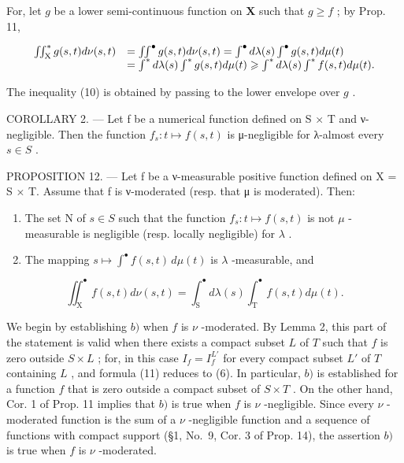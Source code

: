 For, let \(g\) be a lower semi-continuous function on \(\mathbf{X}\) such that \(g \geqslant f\) ; by Prop. 11,

\[
\begin{array}{r l} \iint_ {\mathrm{X}} ^ {*} g (s, t) d \nu (s, t) & = \iint^ {\bullet} g (s, t) d \nu (s, t) = \int^ {\bullet} d \lambda (s) \int^ {\bullet} g (s, t) d \mu (t) \\ & = \int^ {*} d \lambda (s) \int^ {*} g (s, t) d \mu (t) \geqslant \int^ {*} d \lambda (s) \int^ {*} f (s, t) d \mu (t). \end{array}
\]

The inequality (10) is obtained by passing to the lower envelope over \(g\) .

COROLLARY 2. --- Let f be a numerical function defined on S × T and ν-negligible. Then the function \(f_{s}: t \mapsto f(s, t)\) is μ-negligible for λ-almost every \(s \in S\) .

PROPOSITION 12. --- Let f be a ν-measurable positive function defined on X = S × T. Assume that f is ν-moderated (resp. that μ is moderated). Then:

\begin{enumerate}
\def\labelenumi{\alph{enumi})}
\item
  The set N of \(s \in S\) such that the function \(f_{s}: t \mapsto f(s, t)\) is not \(\mu\) -measurable is negligible (resp. locally negligible) for \(\lambda\) .
\item
  The mapping \(s \mapsto \int^{\bullet} f(s, t) \, d\mu(t)\) is \(\lambda\) -measurable, and
\end{enumerate}

\[
\iint_ {\mathrm{X}} ^ {\bullet} f (s, t) d \nu (s, t) = \int_ {\mathrm{S}} ^ {\bullet} d \lambda (s) \int_ {\mathrm{T}} ^ {\bullet} f (s, t) d \mu (t).\tag{11}
\]

We begin by establishing \(b)\) when \(f\) is \(\nu\) -moderated. By Lemma 2, this part of the statement is valid when there exists a compact subset \(L\) of \(T\) such that \(f\) is zero outside \(S \times L\) ; for, in this case \(I_f = I_f^{L'}\) for every compact subset \(L'\) of \(T\) containing \(L\) , and formula (11) reduces to (6). In particular, \(b)\) is established for a function \(f\) that is zero outside a compact subset of \(S \times T\) . On the other hand, Cor. 1 of Prop. 11 implies that \(b)\) is true when \(f\) is \(\nu\) -negligible. Since every \(\nu\) -moderated function is the sum of a \(\nu\) -negligible function and a sequence of functions with compact support (§1, No.~9, Cor. 3 of Prop. 14), the assertion \(b)\) is true when \(f\) is \(\nu\) -moderated.

